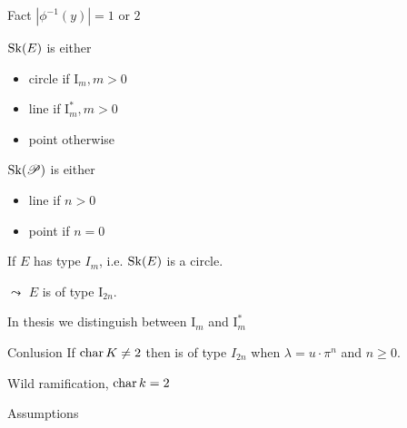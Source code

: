 \begin{frame}[t]
	\begin{minipage}[t]{.7\textwidth}
		
		\begin{block}{Fact}
			$|\phi^{-1}(y)| = 1 \text{ or } 2$
		\end{block}
		\begin{minipage}[t]{.49\textwidth}
			$\operatorname{Sk}(E)$ is either
			\begin{itemize}
				\item circle if $\mathrm I_m, m >0$
				\item line if $\mathrm I_{m}^*, m > 0$
				\item point otherwise
			\end{itemize}
		\end{minipage}
		\begin{minipage}[t]{.49\textwidth}
			$\operatorname{Sk}(\mathscr P)$ is either
			\begin{itemize}
				\item line if $n > 0$ 
				\item point if $n = 0$
			\end{itemize}
		\end{minipage}
		
	\end{minipage}
	\begin{minipage}[t]{.29\textwidth}
	\end{minipage}
\end{frame}
\begin{frame}
	If $E$ has type $I_m$, i.e. $\operatorname{Sk}(E)$ is a circle.
	\begin{figure}
	\end{figure}
	\pause
    $\leadsto$ $E$ is of type $\mathrm I_{2n}$.
\end{frame}
\begin{frame}
	In thesis we distinguish between $\mathrm I_m$ and $\mathrm I_m^*$
	\begin{block}
		{Conlusion}
		If $\operatorname{char} K \ne 2$ then is of type $I_{2n}$ when $\lambda = u \cdot \pi^{n}$ and $n \ge 0$. 
	\end{block}
\end{frame}
\begin{frame}
	{Wild ramification, $\operatorname{char} k = 2$}

	\begin{block}{Assumptions}

	\end{block}
\end{frame}
